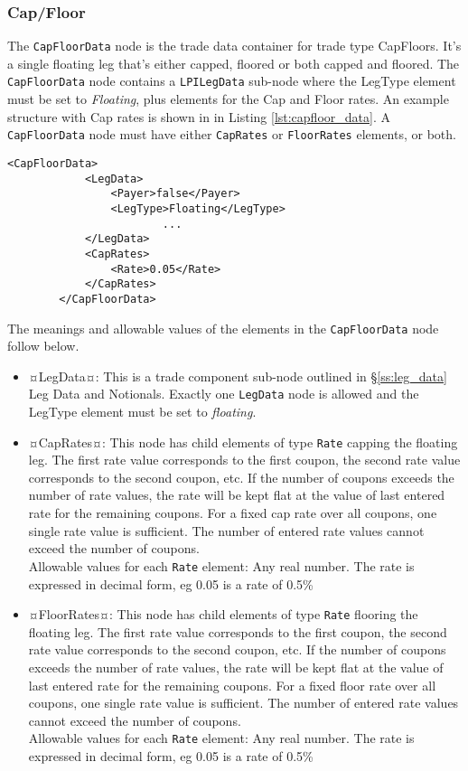 \subsubsection{Cap/Floor}

The \lstinline!CapFloorData! node is the trade data container for trade type CapFloors.  It's a single floating leg that's either capped, floored or both capped and floored. The \lstinline!CapFloorData! node contains a \lstinline!LPILegData!  sub-node where the LegType element must be set to  \emph{Floating}, plus elements for the Cap and Floor rates. An example structure with Cap rates is shown in  in Listing \ref{lst:capfloor_data}. A \lstinline!CapFloorData! node must have either \lstinline!CapRates! or \lstinline!FloorRates! elements, or both. 

{\footnotesize
\begin{lstlisting}[caption=CapFloorData, label=lst:capfloor_data]
        <CapFloorData>
            <LegData>
                <Payer>false</Payer>
                <LegType>Floating</LegType>
                		...
            </LegData>
            <CapRates>
                <Rate>0.05</Rate>
            </CapRates>
        </CapFloorData>
\end{lstlisting}
}

The meanings and allowable values of the elements in the \lstinline!CapFloorData!  node follow below.

\begin{itemize}
\item ¤LegData¤: This is a trade component sub-node outlined in \S \ref{ss:leg_data} Leg Data and Notionals. Exactly one \lstinline!LegData! node is allowed and the LegType element must be set to \emph{floating}.  
\item ¤CapRates¤: This node has child elements of type \lstinline!Rate! capping the floating leg. The first rate value corresponds to the first coupon, the second rate value corresponds to the second coupon, etc. If the number of coupons exceeds the number of rate values, the rate will be kept flat at the value of last entered rate for the remaining coupons. For a fixed cap rate over all coupons, one single rate value is sufficient. The number of entered rate values cannot exceed the number of coupons. \\ Allowable values for each \lstinline!Rate! element:  Any real number. The rate is expressed in decimal form, eg 0.05 is a rate of  0.5\%
\item ¤FloorRates¤: This node has child elements of type \lstinline!Rate! flooring the floating leg.  The first rate value corresponds to the first coupon, the second rate value corresponds to the second coupon, etc. If the number of coupons exceeds the number of rate values, the rate will be kept flat at the value of last entered rate for the remaining coupons. For a fixed floor rate over all coupons, one single rate value is sufficient. The number of entered rate values cannot exceed the number of coupons.\\ Allowable values for each \lstinline!Rate! element:  Any real number. The rate is expressed in decimal form, eg 0.05 is a rate of  0.5\%


\end{itemize}

